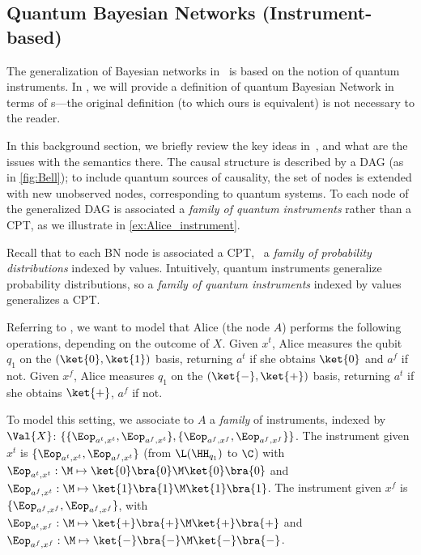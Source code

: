 \subsection{Quantum Bayesian Networks (Instrument-based)}
\label{sec:qbn_instrument}

The generalization of Bayesian networks in~\cite{GBN2014} is based on the notion of quantum instruments. In , we will provide a definition of quantum Bayesian Network in terms of \qfactor s---the original definition (to which ours is equivalent) is not necessary to the reader. 

In this background section, we briefly review the key ideas in~\cite{GBN2014}, and what are the issues with the semantics there. 
The causal structure is described by a DAG (as in \cref{fig:Bell}); to include quantum sources of causality, the set of nodes is extended with new unobserved nodes, corresponding to quantum systems.
To each node of the generalized DAG is associated a \emph{family of quantum instruments} rather than a CPT, as we illustrate in \cref{ex:Alice_instrument}.

\begin{remark}
Recall that to each BN node is associated a CPT, \ie\ a \emph{family of probability distributions} indexed by values.
Intuitively, quantum instruments generalize probability distributions, so a \emph{family of quantum instruments} indexed by values generalizes a CPT.
\end{remark}

\begin{example}
\label{ex:Alice_instrument}
Referring to , we want to model that Alice (the node $A$) performs the following operations, depending on the outcome of $X$.
Given $x^t$, Alice measures the qubit $q_1$ on the $(\ket{0},\ket{1})$ basis, returning $a^t$ if she obtains $\ket{0}$ and $a^f$ if not.
Given $x^f$, Alice measures $q_1$ on the $(\ket{-},\ket{+})$ basis, returning $a^t$ if she obtains $\ket{+}$, $a^f$ if not.

To model this setting, we associate to $A$ a \emph{family} of instruments, indexed by $\Val{X}$: $\{\{\Eop_{a^t,x^t},\Eop_{a^f,x^t}\},\{\Eop_{a^f,x^f},\Eop_{a^f,x^f}\}\}$.
The instrument given $x^t$ is $\{\Eop_{a^t,x^t},\Eop_{a^f,x^t}\}$ (from $\L(\HH_{q_1})$ to $\C$) with $\Eop_{a^t,x^t} : \M \mapsto \ket{0}\bra{0}\M\ket{0}\bra{0}$ and $\Eop_{a^f,x^t}: \M \mapsto \ket{1}\bra{1}\M\ket{1}\bra{1}$.
The instrument given $x^f$ is $\{\Eop_{a^f,x^f},\Eop_{a^f,x^f}\}$, %
with $\Eop_{a^t,x^f} : \M \mapsto \ket{+}\bra{+}\M\ket{+}\bra{+}$ and $\Eop_{a^f,x^f}: \M \mapsto \ket{-}\bra{-}\M\ket{-}\bra{-}$.
\end{example}

